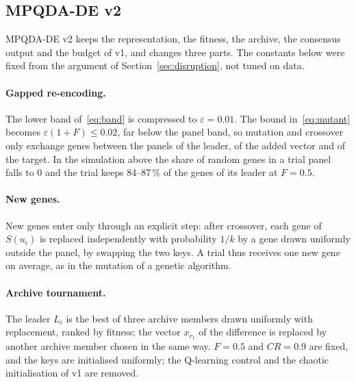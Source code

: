 \subsection{MPQDA-DE v2}\label{sec:v2}

MPQDA-DE v2 keeps the representation, the fitness, the archive, the consensus output and the budget of v1, and changes three
parts. The constants below were fixed from the argument of Section~\ref{sec:disruption}, not tuned on data.

\paragraph{Gapped re-encoding.} The lower band of~\eqref{eq:band} is compressed to $\varepsilon=0.01$. The bound
in~\eqref{eq:mutant} becomes $\varepsilon(1+F)\le 0.02$, far below the panel band, so mutation and crossover only exchange genes
between the panels of the leader, of the added vector and of the target. In the simulation above the share of random genes in
a trial panel falls to 0 and the trial keeps 84--87\,\% of the genes of its leader at $F=0.5$.

\paragraph{New genes.} New genes enter only through an explicit step: after crossover, each gene of $S(u_i)$ is replaced
independently with probability $1/k$ by a gene drawn uniformly outside the panel, by swapping the two keys. A trial thus
receives one new gene on average, as in the mutation of a genetic algorithm.

\paragraph{Archive tournament.} The leader $L_i$ is the best of three archive members drawn uniformly with replacement, ranked
by fitness; the vector $x_{r_1}$ of the difference is replaced by another archive member chosen in the same way. $F=0.5$ and
$CR=0.9$ are fixed, and the keys are initialised uniformly; the Q-learning control and the chaotic initialisation of v1 are
removed.

